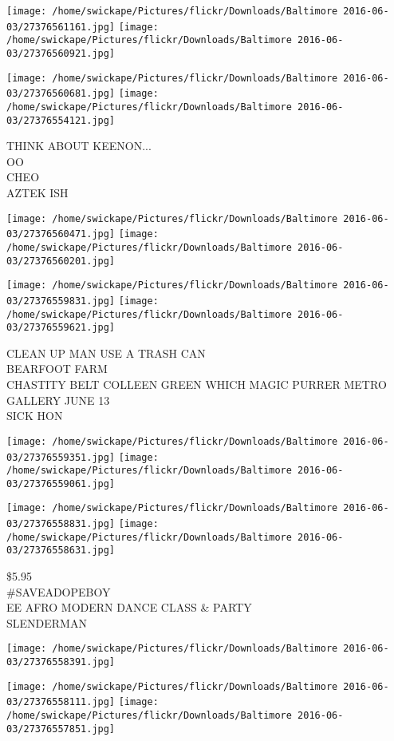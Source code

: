 \documentclass[10pt,letterpaper]{article}
\begin{document}
\texttt{[image: /home/swickape/Pictures/flickr/Downloads/Baltimore 2016-06-03/27376561161.jpg]}
\texttt{[image: /home/swickape/Pictures/flickr/Downloads/Baltimore 2016-06-03/27376560921.jpg]}

\texttt{[image: /home/swickape/Pictures/flickr/Downloads/Baltimore 2016-06-03/27376560681.jpg]}
\texttt{[image: /home/swickape/Pictures/flickr/Downloads/Baltimore 2016-06-03/27376554121.jpg]}

THINK ABOUT KEENON...\\
OO\\
CHEO\\
AZTEK ISH
\pagebreak

\texttt{[image: /home/swickape/Pictures/flickr/Downloads/Baltimore 2016-06-03/27376560471.jpg]}
\texttt{[image: /home/swickape/Pictures/flickr/Downloads/Baltimore 2016-06-03/27376560201.jpg]}

\texttt{[image: /home/swickape/Pictures/flickr/Downloads/Baltimore 2016-06-03/27376559831.jpg]}
\texttt{[image: /home/swickape/Pictures/flickr/Downloads/Baltimore 2016-06-03/27376559621.jpg]}

CLEAN UP MAN USE A TRASH CAN\\
BEARFOOT FARM\\
CHASTITY BELT COLLEEN GREEN WHICH MAGIC PURRER METRO GALLERY JUNE 13\\
SICK HON
\pagebreak

\texttt{[image: /home/swickape/Pictures/flickr/Downloads/Baltimore 2016-06-03/27376559351.jpg]}
\texttt{[image: /home/swickape/Pictures/flickr/Downloads/Baltimore 2016-06-03/27376559061.jpg]}

\texttt{[image: /home/swickape/Pictures/flickr/Downloads/Baltimore 2016-06-03/27376558831.jpg]}
\texttt{[image: /home/swickape/Pictures/flickr/Downloads/Baltimore 2016-06-03/27376558631.jpg]}

\$5.95\\
\#SAVEADOPEBOY\\
EE AFRO MODERN DANCE CLASS \& PARTY\\
SLENDERMAN
\pagebreak

\texttt{[image: /home/swickape/Pictures/flickr/Downloads/Baltimore 2016-06-03/27376558391.jpg]}

\vspace{0.25in}
\texttt{[image: /home/swickape/Pictures/flickr/Downloads/Baltimore 2016-06-03/27376558111.jpg]}
\texttt{[image: /home/swickape/Pictures/flickr/Downloads/Baltimore 2016-06-03/27376557851.jpg]}
\end{document}
